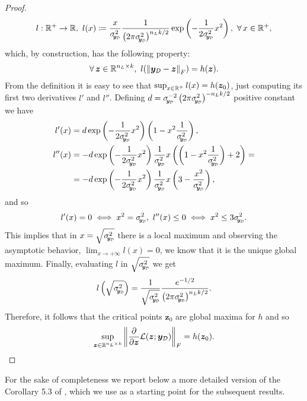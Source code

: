 \begin{proof}
	\begin{equation*}
		l: \real^+ \to \real, \ l(x) \coloneqq \frac{x}{\sigmay^2} \frac{1}{\left(2 \pi \sigmay^2\right)^{n_L k / 2}} \exp{-\frac{1}{2 \sigmay^2} x^2}, \ \forall x \in \real^+,
	\end{equation*}
	which, by construction, has the following property: 
	\begin{equation*}
		\forall \bm{z} \in \real^{n_L \times k}, \ l(\norm{\bm{y}_{\mathcal{D}} - \bm{z}}_F) = h(\bm{z}).
	\end{equation*}
	From the definition it is easy to see that $\sup_{x \in \mathbb{R}^+} l(x) = h(\bm{z}_0)$, just computing its first two derivatives $l'$ and $l''$. Defining $d = \sigmay^{-2} \left(2 \pi \sigmay^2\right)^{- n_L k / 2}$ positive constant we have
	\begin{align*}
		l'(x) & = d \exp{-\frac{1}{2\sigmay^2} x^2} \left(1 - x^2 \frac{1}{\sigmay^2}\right), \\
		l''(x) & = - d \exp{-\frac{1}{2\sigmay^2} x^2} \frac{1}{\sigmay^2} x \left(\left(1 - x^2 \frac{1}{\sigmay^2}\right) + 2\right) = \\
		& = - d \exp{-\frac{1}{2\sigmay^2} x^2} \frac{1}{\sigmay^2} x \left(3 - \frac{x^2}{\sigmay^2}\right),
	\end{align*}
	and so
	\begin{align*}
		l'(x) = 0 \iff x^2 = \sigmay^2, \ l''(x) \leq 0 \iff x^2 \leq 3 \sigmay^2.
	\end{align*}
	This implies that in $x = \sqrt{\sigmay^2}$ there is a local maximum and observing the asymptotic behavior, $\lim_{x \to +\infty} l(x) = 0$, we know that it is the unique global maximum. 
	Finally, evaluating $l$ in $\sqrt{\sigmay^2}$ we get 
	\begin{equation*}
		l\left(\sqrt{\sigmay^2}\right) = \frac{1}{\sqrt{\sigmay^2}} \frac{e^{- 1/2}}{\left(2 \pi \sigmay^2\right)^{n_L k / 2}}.
	\end{equation*}
	Therefore, it follows that the critical points $\bm{z}_0$ are global maxima for $h$ and so
	\begin{equation*}
		\sup_{\bm{z} \in \mathbb{R}^{n_L \times k}} \left\lVert\frac{\partial}{\partial \bm{z}} \mathcal{L}(\bm{z}; \bm{y}_{\mathcal{D}})\right\rVert_F = h(\bm{z}_0).
	\end{equation*}
\end{proof}

For the sake of completeness we report below a more detailed version of the Corollary 5.3 of \citet{trevisan2023}, which we use as a starting point for the subsequent results.

